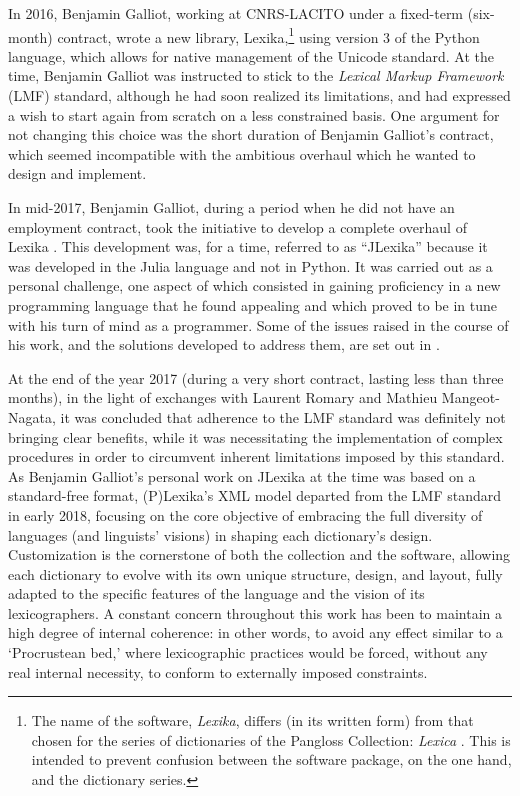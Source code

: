 In 2016, Benjamin Galliot, working at CNRS-LACITO under a fixed-term (six-month) contract, wrote a new library, Lexika,\footnote{The name of the software, \emph{Lexika}, differs (in its written form) from that chosen for the series of dictionaries of the Pangloss Collection: \emph{Lexica} \parencite{lexica2017}. This is intended to prevent confusion between the software package, on the one hand, and the dictionary series.} using version 3 of the Python language, which allows for native management of the Unicode standard. At the time, Benjamin Galliot was instructed to stick to the \emph{Lexical Markup Framework} (LMF) standard, although he had soon realized its limitations, and had expressed a wish to start again from scratch on a less constrained basis. One argument for not changing this choice was the short duration of Benjamin Galliot's contract, which seemed incompatible with the ambitious overhaul which he wanted to design and implement.

In mid-2017, Benjamin Galliot, during a period when he did not have an employment contract, took the initiative to develop a complete overhaul of Lexika \parencite{galliot:2017:lexika}. This development was, for a time, referred to as “JLexika” because it was developed in the Julia language and not in Python. It was carried out as a personal challenge, one aspect of which consisted in gaining proficiency in a new programming language that he found appealing and which proved to be in tune with his turn of mind as a programmer. Some of the issues raised in the course of his work, and the solutions developed to address them, are set out in \cite{galliot:2023:lexikaproblématiques}.

At the end of the year 2017 (during a very short contract, lasting less than three months), in the light of exchanges with Laurent Romary and Mathieu Mangeot-Nagata, it was concluded that adherence to the LMF standard was definitely not bringing clear benefits, while it was necessitating the implementation of complex procedures in order to circumvent inherent limitations imposed by this standard. As Benjamin Galliot's personal work on JLexika at the time was based on a standard-free format, (P)Lexika's XML model departed from the LMF standard in early 2018, focusing on the core objective of embracing the full diversity of languages (and linguists' visions) in shaping each dictionary’s design. Customization is the cornerstone of both the collection and the software, allowing each dictionary to evolve with its own unique structure, design, and layout, fully adapted to the specific features of the language and the vision of its lexicographers. A constant concern throughout this work has been to maintain a high degree of internal coherence: in other words, to avoid any effect similar to a ‘Procrustean bed,’ where lexicographic practices would be forced, without any real internal necessity, to conform to externally imposed constraints.

